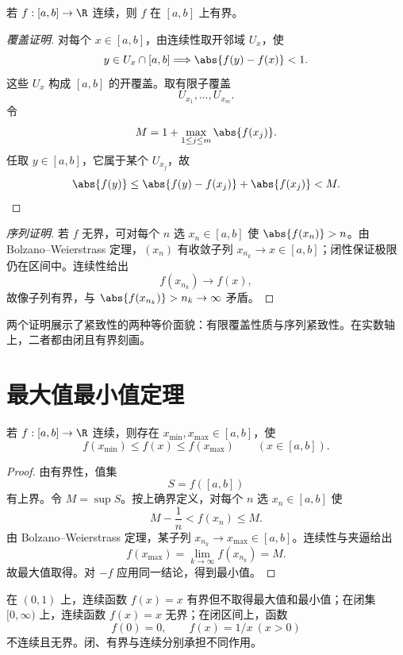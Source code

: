 \begin{theorem}[有界性定理]
若 \(f:[a,b]\to\R\) 连续，则 \(f\) 在 \([a,b]\) 上有界。
\end{theorem}

\begin{proof}[覆盖证明]
对每个 \(x\in[a,b]\)，由连续性取开邻域 \(U_x\)，使
\[
 y\in U_x\cap[a,b]\Longrightarrow\abs{f(y)-f(x)}<1.
\]
这些 \(U_x\) 构成 \([a,b]\) 的开覆盖。取有限子覆盖
\[
 U_{x_1},\ldots,U_{x_m}.
\]
令
\[
 M=1+\max_{1\le j\le m}\abs{f(x_j)}.
\]
任取 \(y\in[a,b]\)，它属于某个 \(U_{x_j}\)，故
\[
 \abs{f(y)}\le\abs{f(y)-f(x_j)}+\abs{f(x_j)}<M.
\]
\end{proof}

\begin{proof}[序列证明]
若 \(f\) 无界，可对每个 \(n\) 选 \(x_n\in[a,b]\) 使 \(\abs{f(x_n)}>n\)。由 Bolzano--Weierstrass 定理，\((x_n)\) 有收敛子列 \(x_{n_k}\to x\in[a,b]\)；闭性保证极限仍在区间中。连续性给出
\[
 f(x_{n_k})\to f(x),
\]
故像子列有界，与 \(\abs{f(x_{n_k})}>n_k\to\infty\) 矛盾。
\end{proof}

两个证明展示了紧致性的两种等价面貌：有限覆盖性质与序列紧致性。在实数轴上，二者都由闭且有界刻画。

\section{最大值最小值定理}

\begin{theorem}
若 \(f:[a,b]\to\R\) 连续，则存在 \(x_{\min},x_{\max}\in[a,b]\)，使
\[
 f(x_{\min})\le f(x)\le f(x_{\max})
 \qquad(x\in[a,b]).
\]
\end{theorem}

\begin{proof}
由有界性，值集
\[
 S=f([a,b])
\]
有上界。令 \(M=\sup S\)。按上确界定义，对每个 \(n\) 选 \(x_n\in[a,b]\) 使
\[
 M-\frac1n<f(x_n)\le M.
\]
由 Bolzano--Weierstrass 定理，某子列 \(x_{n_k}\to x_{\max}\in[a,b]\)。连续性与夹逼给出
\[
 f(x_{\max})
 =\lim_{k\to\infty}f(x_{n_k})
 =M.
\]
故最大值取得。对 \(-f\) 应用同一结论，得到最小值。
\end{proof}

\begin{counterexample}[条件边界]
在 \((0,1)\) 上，连续函数 \(f(x)=x\) 有界但不取得最大值和最小值；在闭集 \([0,\infty)\) 上，连续函数 \(f(x)=x\) 无界；在闭区间上，函数
\[
 f(0)=0,\qquad f(x)=1/x\ (x>0)
\]
不连续且无界。闭、有界与连续分别承担不同作用。
\end{counterexample}

